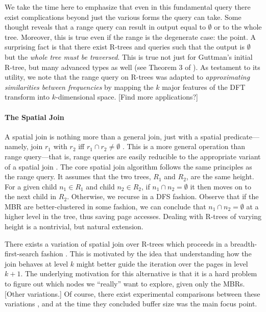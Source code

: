 We take the time here to emphasize that even in this fundamental query there exist complications beyond just the various forms the query can take.
Some thought reveals that a range query can result in output equal to $\emptyset$ or to the whole tree.
Moreover, this is true even if the range is the degenerate case: the point.
A surprising fact is that there exist R-trees and queries such that the output is $\emptyset$ but the \emph{whole tree must be traversed}.
This is true not just for Guttman's initial R-tree, but many advanced types as well (see Theorem 3 of \cite{argeberghaverkortyi04}).
As testament to its utility, we note that the range query on R-trees was adapted to \emph{approximating similarities between frequencies} \cite{agrawalfaloutsosswami93} by mapping the $k$ major features of the DFT transform into $k$-dimensional space. [Find more applications?]

\paragraph{The Spatial Join}
A spatial join is nothing more than a general join, just with a spatial predicate---namely, join $r_1$ with $r_2$ iff $r_1\cap r_2\neq\emptyset$ \cite{brinkhoffkriegelseeger93}.
This is a more general operation than range query---that is, range queries are easily reducible to the appropriate variant of a spatial join \cite{gaedegunther98}.
The core spatial join algorithm \cite{brinkhoffkriegelseeger93} follows the same principles as the range query.
It assumes that the two trees, $R_1$ and $R_2$, are the same height.
For a given child $n_1\in R_1$ and child $n_2\in R_2$, if $n_1\cap n_2=\emptyset$ it then moves on to the next child in $R_2$.
Otherwise, we recurse in a DFS fashion.
Observe that if the MBR are better-clustered in some fashion, we can conclude that $n_1\cap n_2=\emptyset$ at a higher level in the tree, thus saving page accesses.
Dealing with R-trees of varying height is a nontrivial, but natural extension.

There exists a variation of spatial join over R-trees which proceeds in a breadth-first-search fashion \cite{huangjingrundensteiner97}.
This is motivated by the idea that understanding how the join behaves at level $k$ might better guide the iteration over the pages in level $k+1$.
The underlying motivation for this alternative is that it is a hard problem to figure out which nodes we ``really'' want to explore, given only the MBRs.
[Other variations.]
Of course, there exist experimental comparisons between these variations \cite{papadopoulosrigauxscholl99}, and at the time they concluded buffer size was the main focus point.

